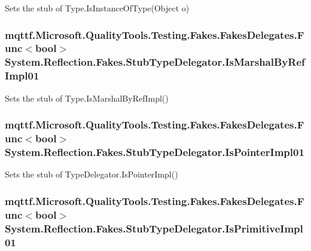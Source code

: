 Sets the stub of Type.\-Is\-Instance\-Of\-Type(\-Object o)

\hypertarget{class_system_1_1_reflection_1_1_fakes_1_1_stub_type_delegator_a6658b273d2de19f906f023328eababed}{
\subsubsection[{Is\-Marshal\-By\-Ref\-Impl01}]{\setlength{\rightskip}{0pt plus 5cm}mqttf.\-Microsoft.\-Quality\-Tools.\-Testing.\-Fakes.\-Fakes\-Delegates.\-Func$<$bool$>$ System.\-Reflection.\-Fakes.\-Stub\-Type\-Delegator.\-Is\-Marshal\-By\-Ref\-Impl01}}\label{class_system_1_1_reflection_1_1_fakes_1_1_stub_type_delegator_a6658b273d2de19f906f023328eababed}


Sets the stub of Type.\-Is\-Marshal\-By\-Ref\-Impl()

\hypertarget{class_system_1_1_reflection_1_1_fakes_1_1_stub_type_delegator_a739990adfdda291649346840848889fd}{
\subsubsection[{Is\-Pointer\-Impl01}]{\setlength{\rightskip}{0pt plus 5cm}mqttf.\-Microsoft.\-Quality\-Tools.\-Testing.\-Fakes.\-Fakes\-Delegates.\-Func$<$bool$>$ System.\-Reflection.\-Fakes.\-Stub\-Type\-Delegator.\-Is\-Pointer\-Impl01}}\label{class_system_1_1_reflection_1_1_fakes_1_1_stub_type_delegator_a739990adfdda291649346840848889fd}


Sets the stub of Type\-Delegator.\-Is\-Pointer\-Impl()

\hypertarget{class_system_1_1_reflection_1_1_fakes_1_1_stub_type_delegator_a9bfa6234dc10a36e2b0f52ac69147085}{
\subsubsection[{Is\-Primitive\-Impl01}]{\setlength{\rightskip}{0pt plus 5cm}mqttf.\-Microsoft.\-Quality\-Tools.\-Testing.\-Fakes.\-Fakes\-Delegates.\-Func$<$bool$>$ System.\-Reflection.\-Fakes.\-Stub\-Type\-Delegator.\-Is\-Primitive\-Impl01}}\label{class_system_1_1_reflection_1_1_fakes_1_1_stub_type_delegator_a9bfa6234dc10a36e2b0f52ac69147085}


